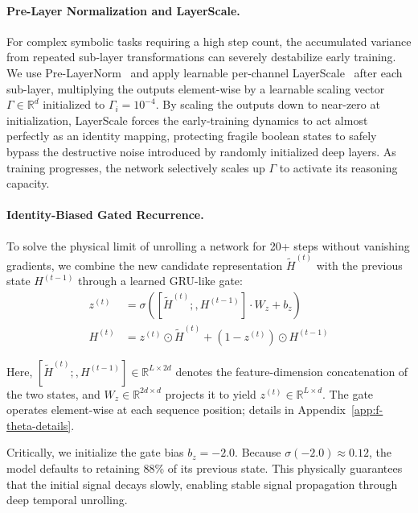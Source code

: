 \paragraph{Pre-Layer Normalization and LayerScale.}

For complex symbolic tasks requiring a high step count, the accumulated variance from repeated sub-layer transformations can severely destabilize early training. We use Pre-LayerNorm~\citep{xiong2020layer} and apply learnable per-channel LayerScale~\citep{touvron2021going} after each sub-layer, multiplying the outputs element-wise by a learnable scaling vector $\Gamma \in \mathbb{R}^d$ initialized to $\Gamma_i = 10^{-4}$. By scaling the outputs down to near-zero at initialization, LayerScale forces the early-training dynamics to act almost perfectly as an identity mapping, protecting fragile boolean states to safely bypass the destructive noise introduced by randomly initialized deep layers. As training progresses, the network selectively scales up $\Gamma$ to activate its reasoning capacity.
 
\paragraph{Identity-Biased Gated Recurrence.}

To solve the physical limit of unrolling a network for 20+ steps without vanishing gradients, we combine the new candidate representation $\tilde{H}^{(t)}$ with the previous state $H^{(t-1)}$ through a learned GRU-like gate:
\begin{align}
    z^{(t)} &= \sigma\!\left([\tilde{H}^{(t)};, H^{(t-1)}] \cdot W_z + b_z\right) \\
    H^{(t)} &= z^{(t)} \odot \tilde{H}^{(t)} + (1 - z^{(t)}) \odot H^{(t-1)}
\end{align}

Here, $[\tilde{H}^{(t)};, H^{(t-1)}] \in \mathbb{R}^{L \times 2d}$ denotes the feature-dimension concatenation of the two states, and $W_z \in \mathbb{R}^{2d \times d}$ projects it to yield $z^{(t)} \in \mathbb{R}^{L \times d}$. The gate operates element-wise at each sequence position; details in Appendix~\ref{app:f-theta-details}.

Critically, we initialize the gate bias $b_z = -2.0$. Because $\sigma(-2.0) \approx 0.12$, the model defaults to retaining 88\% of its previous state. This physically guarantees that the initial signal decays slowly, enabling stable signal propagation through deep temporal unrolling.
 
